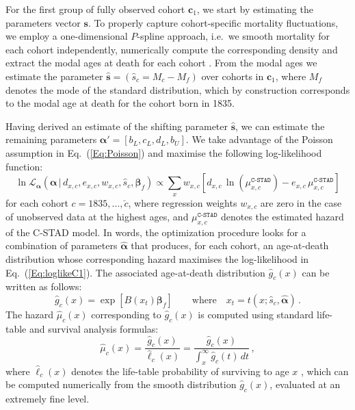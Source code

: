 \documentclass[11pt, a4paper]{article}
\begin{document}
For the first group of fully observed cohort $\bm{c}_1$, we start by estimating the parameters vector $\bm{s}$. To properly capture cohort-specific mortality fluctuations, we employ a one-dimensional $P$-spline approach, i.e.~we smooth mortality for each cohort independently, numerically compute the corresponding density and extract the modal ages at death for each cohort \citep[for a similar approach in a period perspective, see][]{ouellette2011changes}. From the modal ages we estimate the parameter $\hat{\bm{s}}=\left(\hat{s}_{c}=M_{c} - M_f\right)$ over cohorts in $\bm{c}_1$, where $M_f$ denotes the mode of the standard distribution, which by construction corresponds to the modal age at death for the cohort born in 1835. \par

Having derived an estimate of the shifting parameter $\hat{\bm{s}}$, we can estimate the remaining parameters $\bm{\alpha}'=\left[b_{L},c_{L},d_{L},b_{U}\right]$. We take advantage of the Poisson assumption in Eq.~(\ref{Eq:Poisson}) and maximise the following log-likelihood function:
%
\begin{equation}\label{Eq:loglikeC1}
\ln\mathcal{L}_{\bm{\alpha}}\left(\bm{\alpha}\,|\,d_{x,c} , e_{x,c} , w_{x,c} , \hat{s}_{c}, \bm{\beta}_{f}
\right) \propto \sum_{x} w_{x,c} \left[  d_{x,c} \,
\ln \left( \mu^{\texttt{C-STAD}}_{x,c}  \right) - e_{x,c}
\, \mu^{\texttt{C-STAD}}_{x,c} \right] 
\end{equation}
%
for each cohort $c = 1835,\ldots,\breve{c}$, where regression weights $w_{x,c}$ are zero in the case of unobserved data at the highest ages, and $\mu^{\texttt{C-STAD}}_{x,c}$ denotes the estimated hazard of the C-STAD model. In words, the optimization procedure looks for a combination of parameters $\hat{\bm{\alpha}}$ that produces, for each cohort, an age-at-death distribution whose corresponding hazard maximises the log-likelihood in Eq.~(\ref{Eq:loglikeC1}). The associated age-at-death distribution $\hat{g}_{c}(x)$ can be written as follows:
\begin{equation}\label{eq:gBspl}
\hat{g}_{c}(x) = \exp\left[ B(x_{t}) \bm{\beta}_{f} \right] \qquad \mbox{where} \quad x_{t} = t(x; \hat{s}_{c},\hat{\bm{\alpha}}) \, .
\end{equation}
{\color{red}The hazard $\hat{\mu}_c(x)$ corresponding to $\hat{g}_{c}(x)$ is computed using standard life-table and survival analysis formulas:
\begin{equation}\label{Eq:HazardCSTAD}
\hat{\mu}_c(x) = \frac{\hat{g}_c(x)}{\hat{\ell}_c(x)} = \frac{\hat{g}_c(x)}{\int_{x}^{\infty} \hat{g}_c(t)\,dt} \, ,
\end{equation}
where $\hat{\ell}_c(x)$ denotes the life-table probability of surviving to age $x$ \cite[i.e.~the survival function,][]{preston2001demogr,klein2003survival}, which can be computed numerically from the smooth distribution $\hat{g}_{c}(x)$, evaluated at an extremely fine level.}
\end{document}
